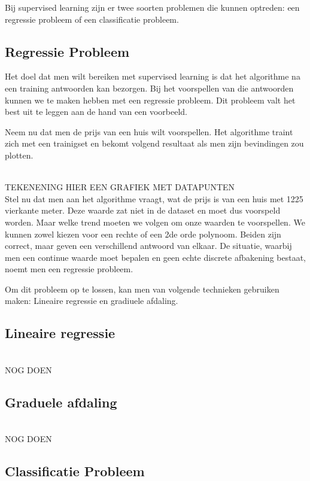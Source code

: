 Bij supervised learning zijn er twee soorten problemen die kunnen optreden: een regressie probleem of een classificatie probleem.

\subsection{Regressie Probleem}\label{Regressie Probleem}

Het doel dat men wilt bereiken met supervised learning is dat het algorithme na een training antwoorden kan bezorgen. Bij het voorspellen van die antwoorden kunnen we te maken hebben met een regressie probleem. Dit probleem valt het best uit te leggen aan de hand van een voorbeeld.

Neem nu dat men de prijs van een huis wilt voorspellen.
Het algorithme traint zich met een trainigset en bekomt volgend resultaat als men zijn bevindingen zou plotten.

\\
TEKENENING HIER EEN GRAFIEK MET DATAPUNTEN 
\\

Stel nu dat men aan het algorithme vraagt, wat de prijs is van een huis met 1225 vierkante meter. Deze waarde zat niet in de dataset en moet dus voorspeld worden.  Maar welke trend moeten we volgen om onze waarden te voorspellen. We kunnen zowel kiezen voor een rechte of een 2de orde polynoom. Beiden zijn correct, maar geven een verschillend antwoord van elkaar. De situatie, waarbij men een continue waarde moet bepalen en geen echte discrete afbakening bestaat, noemt men een regressie probleem.

Om dit probleem op te lossen, kan men van volgende technieken gebruiken maken: Lineaire regressie en gradiuele afdaling.

\subsection{Lineaire regressie}\label{Lineaire regressie}

\\
NOG DOEN
\\

\subsection{Graduele afdaling}\label{Graduele afdaling}

\\
NOG DOEN
\\
\subsection{Classificatie Probleem}\label{Classificatie Probleem}

